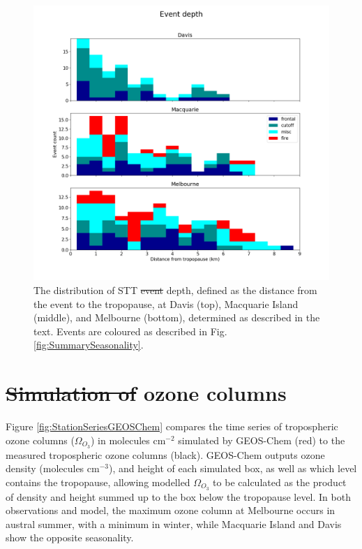 \documentclass[acp, manuscript]{copernicus} %
\providecommand{\DIFadd}[1]{{\protect\color{blue}\uwave{#1}}} %
\providecommand{\DIFdel}[1]{{\protect\color{red}\sout{#1}}}                      %
\providecommand{\DIFaddbegin}{} %
\providecommand{\DIFaddend}{} %
\providecommand{\DIFdelbegin}{} %
\providecommand{\DIFdelend}{} %
\providecommand{\DIFaddFL}[1]{\DIFadd{#1}} %
\providecommand{\DIFdelFL}[1]{\DIFdel{#1}} %
\providecommand{\DIFaddbeginFL}{} %
\providecommand{\DIFaddendFL}{} %
\providecommand{\DIFdelbeginFL}{} %
\providecommand{\DIFdelendFL}{} %
\begin{document}
  \begin{figure}[t]
    \includegraphics[width=12cm]{figures/summary_depth.png}
    \caption{The distribution of STT \DIFdelbeginFL \DIFdelFL{event }\DIFdelendFL \DIFaddbeginFL \DIFaddFL{events }\DIFaddendFL depth, defined as the distance from the event to the tropopause, at Davis (top), Macquarie Island (middle), and Melbourne (bottom), determined as described in the text.
    Events are coloured as described in Fig. \ref{fig:SummarySeasonality}.}
    \label{fig:SummaryTPDepths}    
  \end{figure}

\section{\DIFdelbegin \DIFdel{Simulation of }\DIFdelend \DIFaddbegin \DIFadd{Simulated }\DIFaddend ozone columns}
  \label{sec:ModelComparison}
  Figure \ref{fig:StationSeriesGEOSChem} compares the time series of tropospheric ozone columns ($\Omega_{O_3}$) in molecules cm$^{-2}$ simulated by GEOS-Chem (red) to the measured tropospheric ozone columns (black).
  GEOS-Chem outputs ozone density (molecules cm$^{-3}$), and height of each simulated box, as well as which level contains the tropopause, allowing modelled $\Omega_{O_3}$ to be calculated as the product of density and height summed up to the box below the tropopause level.
  In both observations and model, the maximum ozone column at Melbourne occurs in austral summer, with a minimum in winter, while Macquarie Island and Davis show the opposite seasonality.
\end{document}
